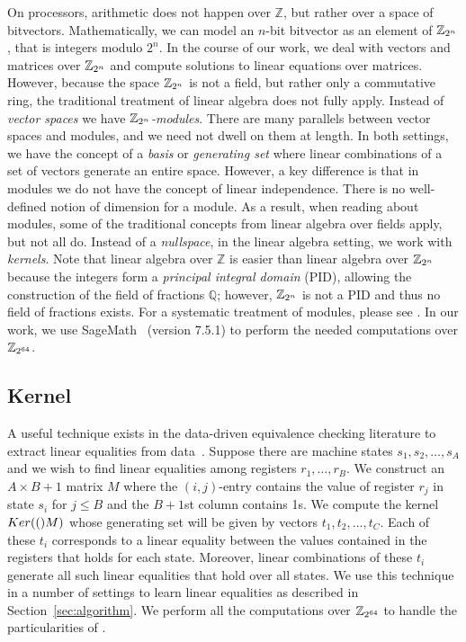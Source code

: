 On processors, arithmetic does not happen over $\mathbb{Z}$, but
rather over a space of bitvectors. Mathematically, we can model
an $n$-bit bitvector as an element of $\mathbb{Z}_{2^{n}}$, that is integers
modulo $2^n$. In the course of our work, we deal with vectors and
matrices over $\mathbb{Z}_{2^{n}}$ and compute solutions to linear equations over
matrices. However, because the space $\mathbb{Z}_{2^{n}}$ is not a field, but
rather only a commutative ring, the traditional treatment of linear
algebra does not fully apply. Instead of \emph{vector spaces} we
have \emph{$\mathbb{Z}_{2^{n}}$-modules}. There are many parallels between vector
spaces and modules, and we need not dwell on them at length. In both
settings, we have the concept of a \emph{basis} or \emph{generating
set} where linear combinations of a set of vectors generate an entire
space. However, a key difference is that in modules we do not have the
concept of linear independence. There is no well-defined notion of
dimension for a module. As a result, when reading about modules, some
of the traditional concepts from linear algebra over fields apply,
but not all do. Instead of a \emph{nullspace}, in the linear algebra
setting, we work with \emph{kernels}. Note that linear algebra over
$\mathbb{Z}$ is easier than linear algebra over $\mathbb{Z}_{2^{n}}$ because the
integers form a \emph{principal integral domain} (PID), allowing the
construction of the field of fractions $\mathbb{Q}$; however, $\mathbb{Z}_{2^{n}}$
is not a PID and thus no field of fractions exists. For a systematic
treatment of modules, please see . In our work,
we use SageMath~\cite{sagemath} (version 7.5.1) to perform the needed
computations over $\mathbb{Z}_{2^{64}}$.

\subsection{Kernel}

A useful technique exists in the data-driven equivalence checking
literature to extract linear equalities from data~\cite{Sharma2013}.
Suppose there are machine states $s_1, s_2, \dotsc, s_A$ and we
wish to find linear equalities among registers $r_1, \dotsc, r_B$.
We construct an $A \times B+1$ matrix $M$ where the $(i,j)$-entry
contains the value of register $r_j$ in state $s_i$ for $j \leq B$ and
the $B+1$st column contains 1s. We compute the kernel $Ker(()M)$
whose generating set will be given by vectors $t_1, t_2, \dotsc,
t_C$. Each of these $t_i$ corresponds to a linear equality between
the values contained in the registers that holds for each state.
Moreover, linear combinations of these $t_i$ generate all such
linear equalities that hold over all states. We use this technique
in a number of settings to learn linear equalities as described in
Section~\ref{sec:algorithm}. We perform all the computations over
$\mathbb{Z}_{2^{64}}$ to handle the particularities of \arch.

